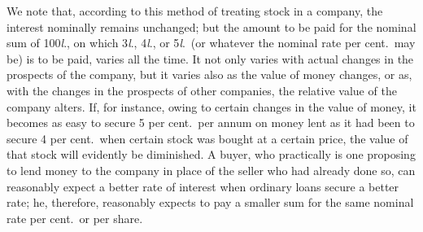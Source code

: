 \documentclass[letterpaper,12pt,oneside,openany]{memoir}
\begin{document}
We note that, according to this method of treating
stock in a company, the interest nominally remains
unchanged; but the amount to be paid for the nominal
sum of 100\textit{l}., on which 3\textit{l}., 4\textit{l}., or 5\textit{l}.\ (or whatever the
nominal rate per cent.\ may be) is to be paid, varies all
the time. It not only varies with actual changes in
the prospects of the company, but it varies also as the
value of money changes, or as, with the changes in the
prospects of other companies, the relative value of the
company alters. If, for instance, owing to certain
changes in the value of money, it becomes as easy to
secure 5 per cent.\ per annum on money lent as it had
been to secure 4 per cent.\ when certain stock was
bought at a certain price, the value of that stock will
evidently be diminished. A buyer, who practically is
one proposing to lend money to the company in place
of the seller who had already done so, can reasonably
expect a better rate of interest when ordinary loans
secure a better rate; he, therefore, reasonably expects
to pay a smaller sum for the same nominal rate per
cent.\ or per share.
\end{document}
